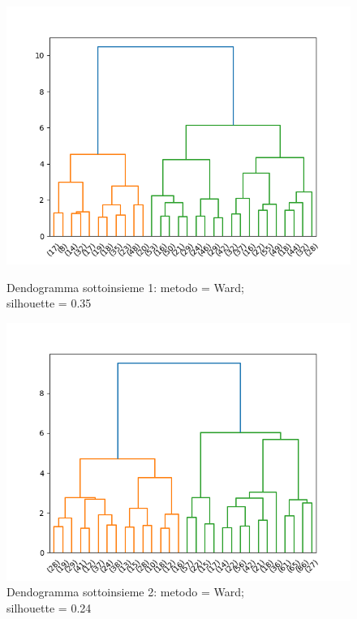 \documentclass[a4paper,9pt]{article}
\begin{document}
  \begin{figure}[H]
    \centering
    \begin{minipage}{.45\textwidth}
      \centering
      \includegraphics[width=\textwidth]{DistanceFromHome,Age,MonthlyIncome035Ward.png}
      \caption{Dendogramma sottoinsieme 1:  metodo = Ward;\\ silhouette = 0.35}
    \end{minipage}
    \begin{minipage}{.45\textwidth}
      \centering
      \includegraphics[width=\textwidth]{dendogram_hierarchicaldf3(ward).png}
      \caption{Dendogramma sottoinsieme 2:  metodo = Ward; \\silhouette = 0.24 }
    \end{minipage}
    \end{figure}
\end{document}
